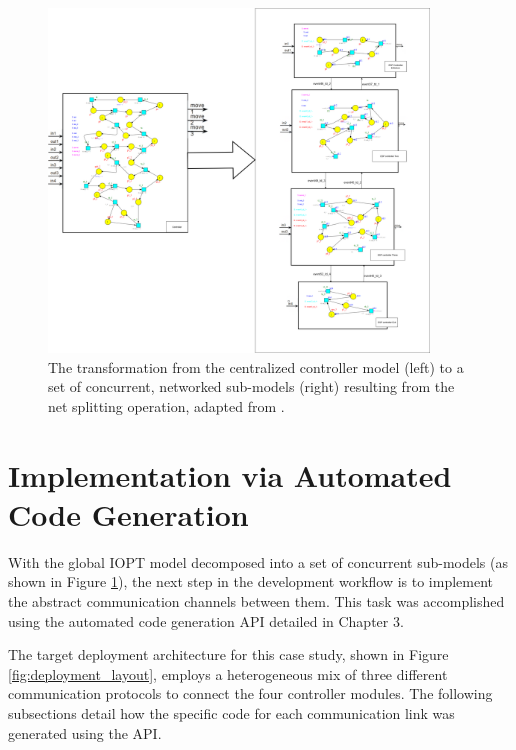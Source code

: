 \begin{figure}[htb]
    \centering
    \includegraphics[width=0.9\textwidth]{Chapters/Figures/controller_decomposition.png}
\caption{The transformation from the centralized controller model (left) to a set of concurrent, networked sub-models (right) resulting from the net splitting operation, adapted from \cite{tavaresgomes2026}.}
    \label{fig:decomposed_model}
\end{figure}


\section{Implementation via Automated Code Generation}
\label{sec:use_case_implementation}

With the global IOPT model decomposed into a set of concurrent sub-models (as shown in Figure \ref{fig:decomposed_model}), the next step in the development workflow is to implement the abstract communication channels between them. This task was accomplished using the automated code generation API detailed in Chapter 3.

The target deployment architecture for this case study, shown in Figure \ref{fig:deployment_layout}, employs a heterogeneous mix of three different communication protocols to connect the four controller modules. The following subsections detail how the specific code for each communication link was generated using the API.

